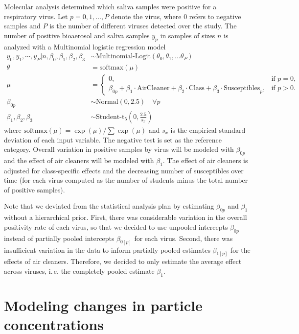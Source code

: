 \documentclass[fleqn,11pt]{wlscirep_supp}
\newcommand\ie{i.\,e.\xspace}
\begin{document}
Molecular analysis determined which saliva samples were positive for a respiratory virus. Let $p = 0, 1, \dots, P$ denote the virus, where $0$ refers to negative samples and $P$ is the number of different viruses detected over the study. The number of positive bioaerosol and saliva samples $y_p$ in samples of sizes $n$ is analyzed with a Multinomial logistic regression model
\begin{align*}
    y_0, y_1, \cdots, y_P | n, \beta_0, \beta_1, \beta_2, \beta_3 &\sim \text{Multinomial-Logit}(\theta_0, \theta_1, \dots \theta_P) \\
    \theta &= \text{softmax}(\mu) \\
    \mu &= \begin{cases}
                0, & \text{if } p=0, \\
                \beta_{0p} + \beta_{1} \cdot \text{AirCleaner} + \beta_2 \cdot \text{Class} + \beta_3 \cdot \text{Susceptibles}_p, & \text{if } p>0.
            \end{cases} \\
    \beta_{0p} &\sim \text{Normal}(0, 2.5) \quad \forall p \\
    \beta_1, \beta_2, \beta_3 &\sim \text{Student-t}_5\left(0, \frac{2.5}{s_{x}}\right) 
\end{align*}
where $\text{softmax}(\mu) = \exp(\mu)/\sum\exp(\mu)$ and $s_{x}$ is the empirical standard deviation of each input variable.  The negative test is set as the reference category. Overall variation in positive samples by virus will be modeled with $\beta_{0p}$ and the effect of air cleaners will be modeled with $\beta_1$. The effect of air cleaners is adjusted for class-specific effects and the decreasing number of susceptibles over time (for each virus computed as the number of students minus the total number of positive samples).

Note that we deviated from the statistical analysis plan by estimating $\beta_{0p}$ and $\beta_1$ without a hierarchical prior. First, there was considerable variation in the overall positivity rate of each virus, so that we decided to use unpooled intercepts $\beta_{0p}$ instead of partially pooled intercepts $\beta_{0[p]}$ for each virus. Second, there was insufficient variation in the data to inform partially pooled estimates $\beta_{1[p]}$ for the effects of air cleaners. Therefore, we decided to only estimate the average effect across viruses, \ie the completely pooled estimate $\beta_1$.  

\section{Modeling changes in particle concentrations}\label{sec:env-regression-model}
\end{document}
